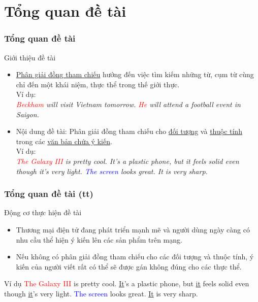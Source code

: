 \documentclass[9pt,xcolor=table,hyperref=unicode]{beamer}
\begin{document}
	\section{Tổng quan đề tài}
	\begin{frame}
		\frametitle{Tổng quan đề tài}
		\begin{block}{Giới thiệu đề tài}
			\begin{itemize}
				\itemsep0.8em
				\item{\underline{Phân giải đồng tham chiếu} hướng đến việc tìm kiếm những từ, cụm từ cùng chỉ đến một khái niệm, thực thể trong thế giới thực.\\
				Ví dụ:\\			
					\textit{\textcolor{red}{Beckham} will visit Vietnam tomorrow. \textcolor{red}{He} will attend a football event in Saigon.}}
				\item{Nội dung đề tài: Phân giải đồng tham chiếu cho \underline{đối tượng} và \underline{thuộc tính} trong các \underline{văn bản chứa ý kiến}.\\
				Ví dụ:\\
					\textit{\textcolor{red}{The Galaxy III} is pretty cool. It's a plastic phone, but it feels solid even though it's very light. \textcolor{blue}{The screen} looks great. It is very sharp.}}
			\end{itemize}
		\end{block}					
	\end{frame}
	
	\begin{frame}
		\frametitle{Tổng quan đề tài (tt)}
		\begin{block}{Động cơ thực hiện đề tài}
			\begin{itemize}	
				\item{Thương mại điện tử đang phát triển mạnh mẽ và người dùng ngày càng có nhu cầu thể hiện ý kiến lên các sản phẩm trên mạng.}
				\item{Nếu không có phân giải đồng tham chiếu cho các đối tượng và thuộc tính, ý kiến của người viết rất có thể sẽ được gán không đúng cho các thực thể.}								
			\end{itemize}		
		\end{block}		
		\begin{block}{Ví dụ}						
			\textcolor{red}{The Galaxy III} is pretty cool. \underline{It}'s a plastic phone, but \underline{it} feels solid even though \underline{it}'s very light. \textcolor{blue}{The screen} looks great. \underline{It} is very sharp.
		\end{block}
	\end{frame}
\end{document}
